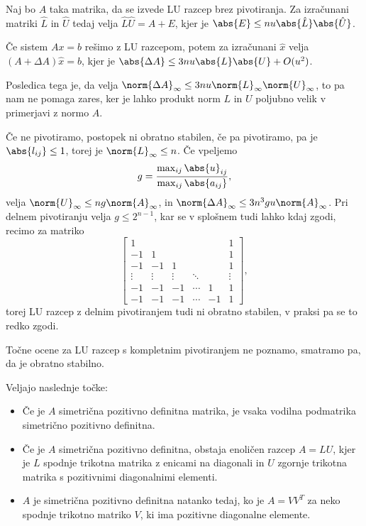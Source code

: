 \begin{lema}
  Naj bo $A$ taka matrika, da se izvede LU razcep brez pivotiranja.
  Za izračunani matriki $\hat{L}$ in $\hat{U}$ tedaj velja $\hat{L} \hat{U} = A
  + E$, kjer je $\abs{E} \le nu \abs{\hat{L}} \abs{\hat{U}}$.
\end{lema}

\begin{izrek}
  Če sistem $Ax = b$ rešimo z LU razcepom, potem za izračunani $\hat{x}$ velja
  $(A+\Delta A) \hat{x} = b$, kjer je $\abs{\Delta A} \le 3 nu \abs{L} \abs{U} +
  O(u^2)$.
\end{izrek}

Posledica tega je, da velja $\norm{\Delta A}_\infty \le 3nu \norm{L}_\infty
\norm{U}_\infty$, to pa nam ne pomaga zares, ker je lahko produkt norm $L$ in
$U$ poljubno velik v primerjavi z normo $A$.

Če ne pivotiramo, postopek ni obratno stabilen, če pa pivotiramo, pa je
$\abs{l_{ij}} \le 1$, torej je $\norm{L}_\infty \le n$.
Če vpeljemo 
\[
  g = \frac{\max_{ij} \abs{u}_{ij}}{\max_{ij} \abs{a_{ij}}},
\]
velja $\norm{U}_\infty \le ng \norm{A}_\infty$, in $\norm{\Delta A}_\infty \le 3
n^3 gu \norm{A}_\infty$.
Pri delnem pivotiranju velja $g \le 2^{n-1}$, kar se v splošnem tudi lahko kdaj
zgodi, recimo za matriko
\[
  \begin{bmatrix}
	1      &        &        &        &    & 1 \\
	-1     & 1      &        &        &    & 1 \\
	-1     & -1     & 1      &        &    & 1 \\
	\vdots & \vdots & \vdots & \ddots &    & \vdots \\
	-1     & -1     & -1     & \cdots & 1  & 1 \\
	-1     & -1     & -1     & \cdots & -1 & 1
  \end{bmatrix},
\]
torej LU razcep z delnim pivotiranjem tudi ni obratno stabilen, v praksi pa se
to redko zgodi.

Točne ocene za LU razcep s kompletnim pivotiranjem ne poznamo, smatramo pa, da
je obratno stabilno.



\begin{izrek}
  Veljajo naslednje točke:
  \begin{itemize}
  \item Če je $A$ simetrična pozitivno definitna matrika, je vsaka vodilna
	podmatrika simetrično pozitivno definitna.
  \item Če je $A$ simetrična pozitivno definitna, obstaja enoličen razcep $A =
	LU$, kjer je $L$ spodnje trikotna matrika z enicami na diagonali in $U$
	zgornje trikotna matrika s pozitivnimi diagonalnimi elementi.
  \item $A$ je simetrična pozitivno definitna natanko tedaj, ko je $A = V V^T$
	za neko spodnje trikotno matriko $V$, ki ima pozitivne diagonalne elemente.
  \end{itemize}
\end{izrek}

